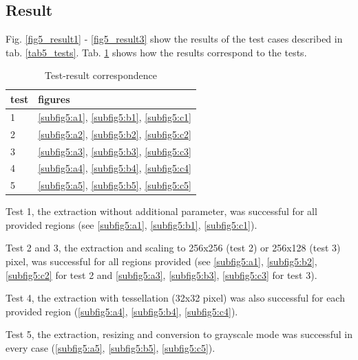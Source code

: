\subsection{Result}

Fig. \ref{fig5_result1} - \ref{fig5_result3} show the results of the test cases described in tab. \ref{tab5_tests}. Tab. \ref{tab5_results} shows how the results correspond to the tests.

\begin{table}[H]
	\begin{center}
		\begin{tabular}{| l | l |}
			\hline
			\textbf{test} & \textbf{figures}\\ \hline
			1 & \ref{subfig5:a1}, \ref{subfig5:b1}, \ref{subfig5:c1}\\ \hline
			2 & \ref{subfig5:a2}, \ref{subfig5:b2}, \ref{subfig5:c2}\\ \hline
			3 & \ref{subfig5:a3}, \ref{subfig5:b3}, \ref{subfig5:c3}\\ \hline
			4 & \ref{subfig5:a4}, \ref{subfig5:b4}, \ref{subfig5:c4}\\ \hline
			5 & \ref{subfig5:a5}, \ref{subfig5:b5}, \ref{subfig5:c5}\\ \hline
		\end{tabular}
		\caption{Test-result correspondence}
		\label{tab5_results}
	\end{center}
\end{table}

Test 1, the extraction without additional parameter, was successful for all provided regions (see \ref{subfig5:a1}, \ref{subfig5:b1}, \ref{subfig5:c1}).

Test 2 and 3, the extraction and scaling to 256x256 (test 2) or 256x128 (test 3) pixel, was successful for all regions provided (see \ref{subfig5:a1}, \ref{subfig5:b2}, \ref{subfig5:c2} for test 2 and \ref{subfig5:a3}, \ref{subfig5:b3}, \ref{subfig5:c3} for test 3).

Test 4, the extraction with tessellation (32x32 pixel) was also successful for each provided region (\ref{subfig5:a4}, \ref{subfig5:b4}, \ref{subfig5:c4}).

Test 5, the extraction, resizing and conversion to grayscale mode was successful in every case (\ref{subfig5:a5}, \ref{subfig5:b5}, \ref{subfig5:c5}).


